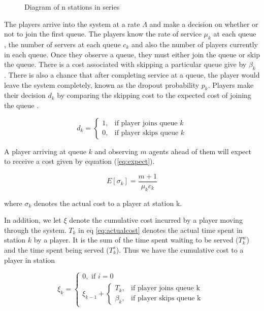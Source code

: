 \documentclass[12pt]{article}
\begin{document}
\begin{figure}[ht]

    \caption{Diagram of n stations in series}
	\label{fig:game_pic}

\end{figure}

The players arrive into the system at a rate $\Lambda$ and make a decision on whether or not to join the first queue. The players know the rate of service $\mu_k$ at each queue , the number of servers at each queue $c_k$ and also the number of players currently in each queue. Once they observe a queue, they must either join the queue or skip the queue. There is a cost associated with skipping a particular queue give by $\beta_k$ .  There is also a chance that after completing service at a queue, the player would leave the system completely, known as the dropout probability $p_k$. Players make their decision $d_k$ by comparing the skipping cost to the expected cost of joining the queue .

\begin{equation}\label{eq:decision}
    d_k=
\begin{cases}
    1,& \text{if player joins queue } k \\
    0,& \text{if player skips queue } k
\end{cases}
\end{equation}

A player arriving at queue $k$ and observing $m$ agents ahead of them will expect to receive a cost given by equation (\ref{eq:expect}).

\begin{equation} \label{eq:expect}
	E[\sigma_{k}] = \frac{m+1}{\mu_k c_k}
\end{equation}

where $\sigma_{k}$ denotes the actual cost to a player at station k.

In addition, we let $\xi$ denote the cumulative cost incurred by a player moving through the system. $T_{k}$ in eq \ref{eq:actualcost} denotes the actual time spent in station $k$ by a player. It is the sum of the time spent waiting to be served ($T^{w}_{k}$) and the time spent being served ($T^{s}_{k}$). Thus we have the cumulative cost to a player in station

\begin{equation}\label{eq:actualcost}
\xi_{k} = \begin{cases}
		0, \text{ if } i = 0 \\
        \xi_{k-1} + \begin{cases}
        	  	T_{k},& \text{if player joins queue k} \\
    			\beta_{k},& \text{if player skips queue k}
        	  \end{cases}

	  \end{cases}
\end{equation}
\end{document}
